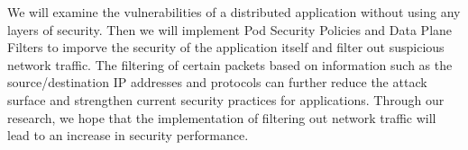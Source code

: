 
We will examine the vulnerabilities of a distributed application without using
any layers of security. Then we will implement Pod Security Policies and Data Plane Filters
to imporve the security of the application itself and filter out suspicious network traffic.
The filtering of certain packets based on information such as the source/destination
IP addresses and protocols can further reduce the attack surface and strengthen current security practices
for applications. Through our research, we hope that the implementation of filtering
out network traffic will lead to an increase in security performance.